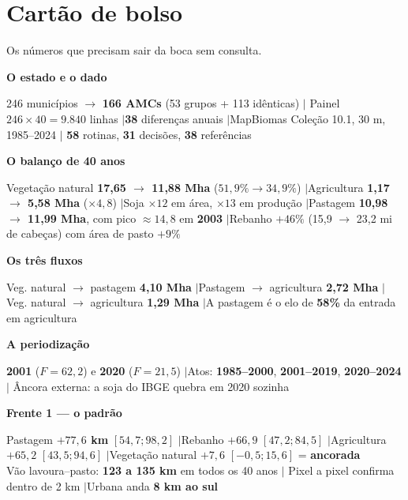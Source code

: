 \chapter{Cartão de bolso}

\newcommand{\bloco}[1]{%
  \par\Needspace*{5\baselineskip}\vspace{10pt}%
  {\color{cortinta}\large\bfseries #1}\par\vspace{2pt}}

Os números que precisam sair da boca sem consulta.

\bloco{O estado e o dado}

\vspace{2pt}
246 municípios $\to$ \textbf{166 AMCs} (53 grupos + 113 idênticas) \quad$|$\quad
Painel $246 \times 40 = 9.840$ linhas \quad$|$\quad \textbf{38} diferenças
anuais \quad$|$\quad MapBiomas Coleção 10.1, 30 m, 1985--2024 \quad$|$\quad
\textbf{58} rotinas, \textbf{31} decisões, \textbf{38} referências

\bloco{O balanço de 40 anos}
Vegetação natural \textbf{17,65 $\to$ 11,88 Mha} ($51{,}9\% \to 34{,}9\%$)
\quad$|$\quad Agricultura \textbf{1,17 $\to$ 5,58 Mha} ($\times 4{,}8$)
\quad$|$\quad Soja $\times 12$ em área, $\times 13$ em produção
\quad$|$\quad Pastagem \textbf{10,98 $\to$ 11,99 Mha}, com pico $\approx 14{,}8$
em \textbf{2003} \quad$|$\quad Rebanho $+46\%$ (15,9 $\to$ 23,2 mi de cabeças)
com área de pasto $+9\%$

\bloco{Os três fluxos}
Veg. natural $\to$ pastagem \textbf{4,10 Mha} \quad$|$\quad Pastagem $\to$
agricultura \textbf{2,72 Mha} \quad$|$\quad Veg. natural $\to$ agricultura
\textbf{1,29 Mha} \quad$|$\quad A pastagem é o elo de \textbf{58\%} da entrada
em agricultura

\bloco{A periodização}
\textbf{2001} ($F = 62{,}2$) e \textbf{2020} ($F = 21{,}5$) \quad$|$\quad Atos:
\textbf{1985--2000}, \textbf{2001--2019}, \textbf{2020--2024} \quad$|$\quad
Âncora externa: a soja do IBGE quebra em 2020 sozinha

\bloco{Frente 1 --- o padrão}
Pastagem \textbf{$+77{,}6$ km} $[54{,}7; 98{,}2]$ \quad$|$\quad Rebanho
\textbf{$+66{,}9$} $[47{,}2; 84{,}5]$ \quad$|$\quad Agricultura
\textbf{$+65{,}2$} $[43{,}5; 94{,}6]$ \quad$|$\quad Vegetação natural
$+7{,}6$ $[-0{,}5; 15{,}6]$ = \textbf{ancorada} \\
Vão lavoura--pasto: \textbf{123 a 135 km} em todos os 40 anos \quad$|$\quad
Pixel a pixel confirma dentro de 2 km \quad$|$\quad Urbana anda \textbf{8 km ao
sul}

